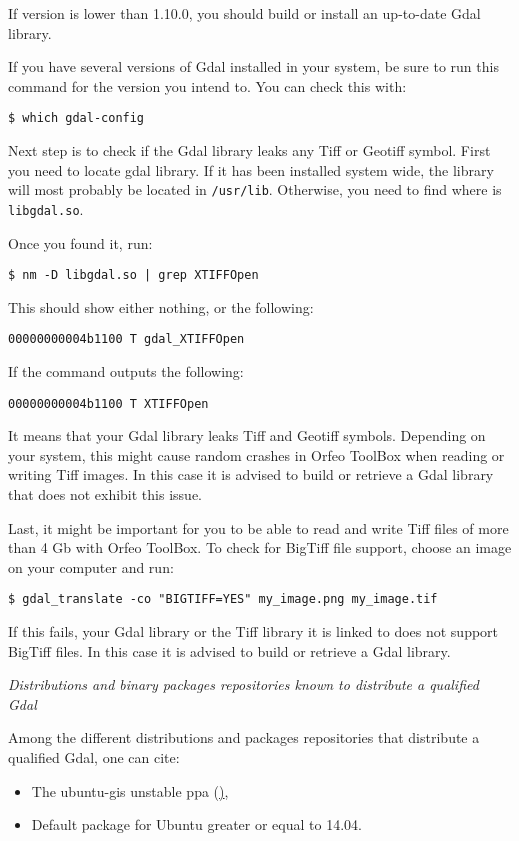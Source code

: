 If version is lower than 1.10.0, you should build or install an up-to-date Gdal library.

If you have several versions of Gdal installed in your system, be sure to run this command for the version you intend to. You can check this with:
\begin{verbatim}
$ which gdal-config
\end{verbatim}

Next step is to check if the Gdal library leaks any Tiff or Geotiff symbol. First you need to locate gdal library. If it has been installed system wide, the library will most probably be located in \texttt{/usr/lib}. Otherwise, you need to find where is \texttt{libgdal.so}.

Once you found it, run:
\begin{verbatim}
$ nm -D libgdal.so | grep XTIFFOpen
\end{verbatim}

This should show either nothing, or the following:

\begin{verbatim}
00000000004b1100 T gdal_XTIFFOpen
\end{verbatim}

If the command outputs the following:

\begin{verbatim}
00000000004b1100 T XTIFFOpen
\end{verbatim}

It means that your Gdal library leaks Tiff and Geotiff symbols. Depending on your system, this might cause random crashes in Orfeo ToolBox when reading or writing Tiff images. In this case it is advised to build or retrieve a Gdal library that does not exhibit this issue.

Last, it might be important for you to be able to read and write Tiff files of more than 4 Gb with Orfeo ToolBox. To check for BigTiff file support, choose an image on your computer and run:
\begin{verbatim}
$ gdal_translate -co "BIGTIFF=YES" my_image.png my_image.tif
\end{verbatim}

If this fails, your Gdal library or the Tiff library it is linked to does not support BigTiff files. In this case it is advised to build or retrieve a Gdal library.

\emph{Distributions and binary packages repositories known to distribute a qualified Gdal}


Among the different distributions and packages repositories that distribute a qualified Gdal, one can cite:
\begin{itemize}
\item The ubuntu-gis unstable ppa (\href{https://launchpad.net/~ubuntugis/+archive/ubuntugis-unstable}),
\item Default package for Ubuntu greater or equal to 14.04.
\end{itemize}


